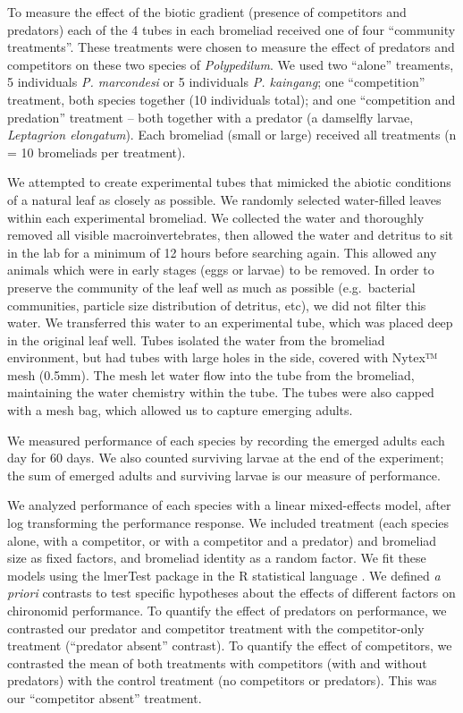 To measure the effect of the biotic gradient (presence of competitors
and predators) each of the 4 tubes in each bromeliad received one of
four ``community treatments''. These treatments were chosen to measure
the effect of predators and competitors on these two species of
\emph{Polypedilum}. We used two ``alone'' treaments, 5 individuals
\emph{P. marcondesi} or 5 individuals \emph{P. kaingang}; one
``competition'' treatment, both species together (10 individuals total);
and one ``competition and predation'' treatment -- both together with a
predator (a damselfly larvae, \emph{Leptagrion elongatum}). Each
bromeliad (small or large) received all treatments (n = 10 bromeliads
per treatment).

We attempted to create experimental tubes that mimicked the abiotic
conditions of a natural leaf as closely as possible. We randomly
selected water-filled leaves within each experimental bromeliad. We
collected the water and thoroughly removed all visible
macroinvertebrates, then allowed the water and detritus to sit in the
lab for a minimum of 12 hours before searching again. This allowed any
animals which were in early stages (eggs or larvae) to be removed. In
order to preserve the community of the leaf well as much as possible
(e.g.~bacterial communities, particle size distribution of detritus,
etc), we did not filter this water. We transferred this water to an
experimental tube, which was placed deep in the original leaf well.
Tubes isolated the water from the bromeliad environment, but had tubes
with large holes in the side, covered with Nytex™ mesh (0.5mm). The mesh
let water flow into the tube from the bromeliad, maintaining the water
chemistry within the tube. The tubes were also capped with a mesh bag,
which allowed us to capture emerging adults.

We measured performance of each species by recording the emerged adults
each day for 60 days. We also counted surviving larvae at the end of the
experiment; the sum of emerged adults and surviving larvae is our
measure of performance.

We analyzed performance of each species with a linear mixed-effects
model, after log transforming the performance response. We included
treatment (each species alone, with a competitor, or with a competitor
and a predator) and bromeliad size as fixed factors, and bromeliad
identity as a random factor. We fit these models using the lmerTest
package \citep{lmertest} in the R statistical language \citep{rcore}. We
defined \emph{a priori} contrasts to test specific hypotheses about the
effects of different factors on chironomid performance. To quantify the
effect of predators on performance, we contrasted our predator and
competitor treatment with the competitor-only treatment (``predator
absent'' contrast). To quantify the effect of competitors, we contrasted
the mean of both treatments with competitors (with and without
predators) with the control treatment (no competitors or predators).
This was our ``competitor absent'' treatment.

